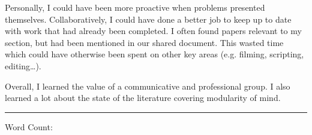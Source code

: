\documentclass[paper=a4,fontsize=16pt]{article}
\newcommand{\getwordcount}{}
\begin{document}
Personally, I could have been more proactive when problems presented themselves.
Collaboratively, I could have done a better job to keep up to date with work
that had already been completed. I often found papers relevant to my section,
but had been mentioned in our shared document. This wasted time which could have
otherwise been spent on other key areas (e.g. filming, scripting,
editing\dots).

Overall, I learned the value of a communicative and professional group. I also
learned a lot about the state of the literature covering modularity of mind.

\vspace{4em}
\begin{flushright}
    \rule{0.3\linewidth}{1pt}\par
    \vspace{0.5em}
    Word Count: \textbf{\getwordcount}
\end{flushright}
\end{document}
